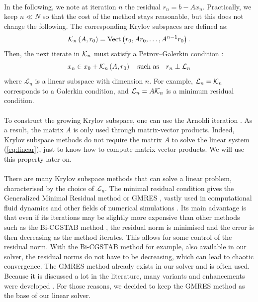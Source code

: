       \paragraph{}
      In the following, we note at iteration $n$ the residual $r_n = b - A x_n$.
      Practically, we keep $n \ll N$ so that the cost of the method stays reasonable, but this does not change the following.
      The corresponding Krylov subspaces are defined as:
  		\begin{equation}
  			\krylov[A, r_0]{n} = \operatorname{Vect}\left( r_0, A r_0, \dots, A^{n-1} r_0 \right) .
  		\end{equation}
      Then, the next iterate in $\krylov{n}$ must satisfy a Petrov--Galerkin condition \cite{SimonciniSzyld2007}:
  		\begin{equation}
  			x_n \in x_0 + \krylov[A, r_0]{n} \quad \textrm{such as} \quad r_n \perp \mathcal{L}_n
  		\end{equation}
      where $\mathcal{L}_n$ is a linear subspace with dimension $n$.
      For example, $\mathcal{L}_n = \krylov{n}$ corresponds to a Galerkin condition, and $\mathcal{L}_n = A \krylov{n}$ is a minimum residual condition.

      \paragraph{}
      To construct the growing Krylov subspace, one can use the Arnoldi iteration \cite{TrefethenBau1997}.
      As a result, the matrix $A$ is only used through matrix-vector products.
      Indeed, Krylov subspace methods do not require the matrix $A$ to solve the linear system (\ref{eq:linear}), just to know how to compute matrix-vector products.
      We will use this property later on.

      \paragraph{}
      There are many Krylov subspace methods that can solve a linear problem, characterised by the choice of $\mathcal{L}_n$.
      The minimal residual condition gives the Generalized Minimal Residual method or GMRES \cite{SaadSchultz1986}, vastly used in computational fluid dynamics \cite{FrancoCamierAndrejEtAl2020} and other fields of numerical simulations \cite{ErnstGander2012, Mercier2015}.
      Its main advantage is that even if its iterations may be slightly more expensive than other methods such as the Bi-CGSTAB method \cite{Vorst1992, TrefethenBau1997}, the residual norm is minimised and the error is then decreasing as the method iterates.
      This allows for some control of the residual norm.
      With the Bi-CGSTAB method for example, also available in our solver, the residual norms do not have to be decreasing, which can lead to chaotic convergence.
      The GMRES method already exists in our solver and is often used.
      Because it is discussed a lot in the literature, many variants and enhancements were developed \cite{CoulaudGiraudRametEtAl2013, Vasseur2016, JolivetTournier2016}.
      For those reasons, we decided to keep the GMRES method as the base of our linear solver.

